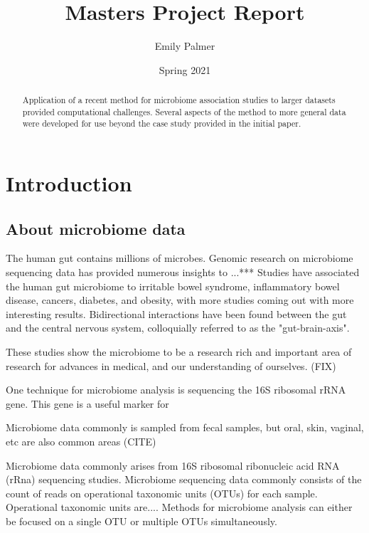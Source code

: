\documentclass[12pt]{article}
\title{Masters Project Report}
\author{Emily Palmer}
\date{Spring 2021}
\begin{document}
\maketitle

\begin{abstract}
  Application of a recent method for microbiome association studies to larger datasets provided computational challenges. Several aspects of the method to more general data were developed for use beyond the case study provided in the initial paper.
\end{abstract}


\tableofcontents



\section{Introduction}

\subsection{About microbiome data}
The human gut contains millions of microbes.
Genomic research on microbiome sequencing data has provided numerous insights to ...*** Studies have associated the human gut microbiome to irritable bowel syndrome, inflammatory bowel disease, cancers, diabetes, and obesity, with more studies coming out with more interesting results. \cite{kinross2008human} Bidirectional interactions have been found between the gut and the central nervous system, colloquially referred to as the "gut-brain-axis". \cite{mayer2015gut}

These studies show the microbiome to be a research rich and important area of research for advances in medical, and our understanding of ourselves. (FIX)


One technique for microbiome analysis is sequencing the 16S ribosomal rRNA gene. This gene is a useful marker for



Microbiome data commonly is sampled from fecal samples, but oral, skin, vaginal, etc are also common areas (CITE)


Microbiome data commonly arises from 16S ribosomal ribonucleic acid RNA (rRna) sequencing studies. Microbiome sequencing data commonly consists of the count of reads on operational taxonomic units (OTUs) for each sample. Operational taxonomic units are.... Methods for microbiome analysis can either be focused on a single OTU or multiple OTUs simultaneously.
\end{document}
